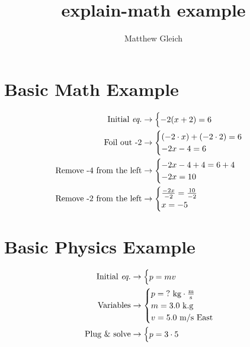 \documentclass{report}
\title{explain-math example}
\author{Matthew Gleich}
\date{}
\begin{document}
    \maketitle

    \section{Basic Math Example}
        \begin{align*}
            \textrm{Initial \textit{eq.}}&\rightarrow \begin{cases} \displaystyle -2(x + 2) = 6 \end{cases} \\
            \textrm{Foil out -2}&\rightarrow \begin{cases} 
                (-2 \cdot x) + (-2 \cdot 2) = 6 \\
                -2x - 4 = 6
             \end{cases} \\
            \textrm{Remove -4 from the left}&\rightarrow \begin{cases} 
                -2x - 4 + 4 = 6 + 4 \\
                -2x = 10
             \end{cases} \\
            \textrm{Remove -2 from the left}&\rightarrow \begin{cases} 
                \frac{-2x}{-2} = \frac{10}{-2} \\
                x = -5
             \end{cases} \\
        \end{align*}

    \section{Basic Physics Example}
        \begin{align*}
            \textrm{Initial \textit{eq.}}&\rightarrow \begin{cases} \displaystyle p = mv \end{cases} \\
            \textrm{Variables}&\rightarrow \begin{cases} 
                p = \textrm{?} \textrm{ kg} \cdot \frac{\textrm{m}}{\textrm{s}} \\
                m = 3.0 \textrm{ k.g} \\
                v = 5.0 \textrm{ m/s East}
             \end{cases} \\
            \textrm{Plug \& solve}&\rightarrow \begin{cases} p = 3 \cdot 5 \end{cases} \\
        \end{align*}
\end{document}
